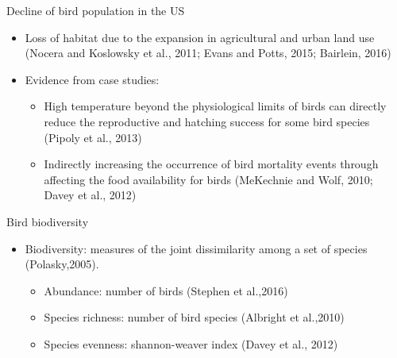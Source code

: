 \documentclass[handout]{beamer}
\begin{document}
\begin{frame}{Decline of bird population in the US}
\begin{itemize}
  \item Loss of habitat due to the expansion in agricultural and urban land use (Nocera and Koslowsky et al., 2011; Evans and Potts, 2015; Bairlein, 2016)
  \item Evidence from case studies:
  \begin{itemize}
  \item High temperature beyond the physiological limits of birds can directly reduce the reproductive and hatching success for some bird species (Pipoly et al., 2013)
  \item Indirectly increasing the occurrence of bird mortality events through affecting the food availability for birds (MeKechnie and Wolf, 2010; Davey et al., 2012)
   \end{itemize}
\end{itemize}
\end{frame}


\begin{frame}{Bird biodiversity}
  \begin{itemize}
    \item Biodiversity: measures of the joint dissimilarity among a set of species (Polasky,2005).
    \begin{itemize}
      \item Abundance: number of birds (Stephen et al.,2016)
      \item Species richness: number of bird species (Albright et al.,2010)
      \item Species evenness: shannon-weaver index (Davey et al., 2012)
    \end{itemize}
  \end{itemize}
\end{frame}
\end{document}
